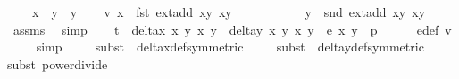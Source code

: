 \begin{isabellebody}
\ \ \ \ x{}{\isacharcircum}{}\ {\isacharasterisk}\ y{}{\isacharcircum}{}\ {\isacharasterisk}\ y{}{\isacharcircum}{}{\isacharparenright}{\isachardoublequoteclose}\isanewline
\isanewline
\ \ \isamarkupfalse%
\ v{}{\isacharcolon}\ {\isachardoublequoteopen}x{}\ {\isacharequal}\ fst\ {\isacharparenleft}ext{\isacharunderscore}add\ {\isacharparenleft}x{}{\isacharcomma}y{}{\isacharparenright}\ {\isacharparenleft}x{}{\isacharcomma}y{}{\isacharparenright}{\isacharparenright}{\isachardoublequoteclose}\isanewline
\ \ \ \ \ \ \ \ \ \ \ {\isachardoublequoteopen}y{}\ {\isacharequal}\ snd\ {\isacharparenleft}ext{\isacharunderscore}add\ {\isacharparenleft}x{}{\isacharcomma}y{}{\isacharparenright}\ {\isacharparenleft}x{}{\isacharcomma}y{}{\isacharparenright}{\isacharparenright}{\isachardoublequoteclose}\isanewline
\ \ \ \ \isamarkupfalse%
\ assms{\isacharparenleft}{}{\isacharparenright}\ \isamarkupfalse%
\ simp{\isacharplus}\isanewline
\isanewline
\ \ \isamarkupfalse%
\ {\isachardoublequoteopen}t{\isacharcircum}{}\ {\isacharasterisk}\ {\isacharparenleft}delta{\isacharunderscore}x\ x{}\ y{}\ x{}\ y{}{\isacharparenright}{\isacharcircum}{}\ {\isacharasterisk}\ {\isacharparenleft}delta{\isacharunderscore}y\ x{}\ y{}\ x{}\ y{}{\isacharparenright}{\isacharcircum}{}\ {\isacharasterisk}\ e{\isacharprime}\ x{}\ y{}\ {\isacharequal}\ p{\isachardoublequoteclose}\isanewline
\ \ \ \ \isamarkupfalse%
\ e{\isacharprime}{\isacharunderscore}def\ v{}\isanewline
\ \ \ \ \isamarkupfalse%
{\isacharparenleft}simp{\isacharparenright}\isanewline
\ \ \ \ \isamarkupfalse%
{\isacharparenleft}subst\ {\isacharparenleft}{}{\isacharparenright}\ delta{\isacharunderscore}x{\isacharunderscore}def{\isacharbrackleft}symmetric{\isacharbrackright}{\isacharparenright}{\isacharplus}\isanewline
\ \ \ \ \isamarkupfalse%
{\isacharparenleft}subst\ {\isacharparenleft}{}{\isacharparenright}\ delta{\isacharunderscore}y{\isacharunderscore}def{\isacharbrackleft}symmetric{\isacharbrackright}{\isacharparenright}{\isacharplus}\isanewline
\ \ \ \ \isamarkupfalse%
{\isacharparenleft}subst\ power{\isacharunderscore}divide{\isacharparenright}{\isacharplus}\isanewline

\end{isabellebody}
